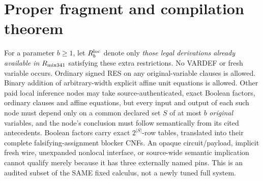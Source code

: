 \documentclass[11pt]{article}
\begin{document}
\section*{Proper fragment and compilation theorem}
For a parameter $b\ge1$, let $R^{\rm loc}_b$ denote only \emph{those legal derivations already available in} $R_{\rm mix341}$ satisfying these extra restrictions. No VARDEF or fresh variable occurs. Ordinary signed RES on any original-variable clauses is allowed. Binary addition of arbitrary-width explicit affine unit equations is allowed. Other paid local inference nodes may take source-authenticated, exact Boolean factors, ordinary clauses and affine equations, but every input and output of each such node must depend only on a common declared set $S$ of at most $b$ \emph{original} variables, and the node's conclusion must follow semantically from its cited antecedents. Boolean factors carry exact $2^{|S|}$-row tables, translated into their complete falsifying-assignment blocker CNFs. An opaque circuit/payload, implicit fresh wire, unexpanded nonlocal interface, or source-wide semantic implication cannot qualify merely because it has three externally named pins. This is an audited subset of the SAME fixed calculus, not a newly tuned full system.
\end{document}
